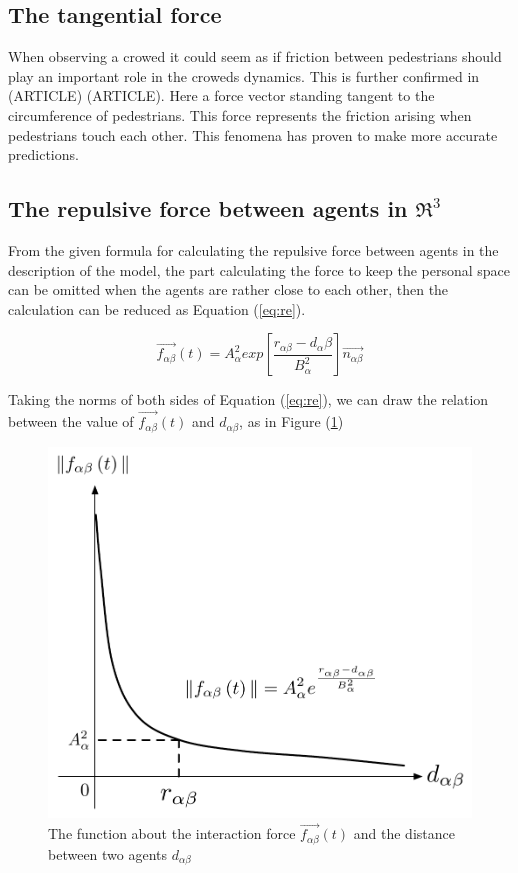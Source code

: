 \subsection{The tangential force}
When observing a crowed it could seem as if friction between pedestrians should play an important role in the croweds dynamics. This is further confirmed in (ARTICLE) (ARTICLE). Here a force vector standing tangent to the circumference of pedestrians. This force represents the friction arising when pedestrians touch each other. This fenomena has proven to make more accurate predictions.


\subsection{The repulsive force between agents in $ \Re ^{3}$}
From the given formula for calculating the repulsive force between agents in the description of the model, the part calculating the force to keep the personal space can be omitted when the agents are rather close to each other, then the calculation can be reduced as Equation (\ref{eq:re}).

\begin{equation}\label{eq:re}
\overrightarrow{f_{\alpha\beta}}(t) = A_{\alpha}^{2} exp\left[ \frac{r_{\alpha\beta} - d_{\alpha}\beta}{B_{\alpha}^{2}}\right]  \overrightarrow{n_{\alpha\beta}}
\end{equation}

Taking the norms of both sides of Equation (\ref{eq:re}), we can draw the relation between the value of 
$\overrightarrow{f_{\alpha\beta}}(t)$ and $d_{\alpha \beta}$, as in Figure (\ref{fig:physicalinteraction})
\\
\begin{figure}
\centering
\includegraphics[scale=0.45]{Figures/physicalinteraction.pdf} 
\caption{The function about the interaction force $\vec{f_{\alpha\beta}}(t)$ and the distance between two agents
$d_{\alpha\beta}$ }\label{fig:physicalinteraction}
\end{figure}

